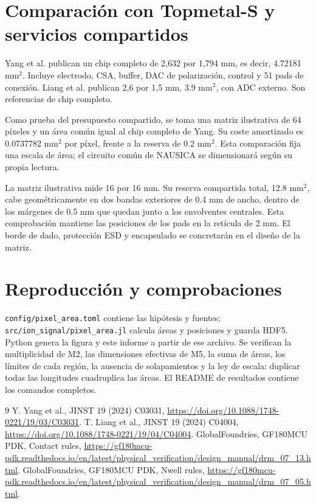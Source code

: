 \documentclass[11pt,a4paper]{article}
\begin{document}
\section*{Comparación con Topmetal-S y servicios compartidos}
Yang et al. publican un chip completo de 2,632 por 1,794 mm, es decir,
4.72181 mm$^2$. Incluye electrodo, CSA, buffer, DAC de polarización, control y
51 pads de conexión. Liang et al. publican 2,6 por 1,5 mm, 3.9 mm$^2$,
con ADC externo. Son referencias de chip completo.

Como prueba del presupuesto compartido, se toma una matriz ilustrativa de
64 píxeles y un área común igual al chip completo de Yang. Su coste
amortizado es 0.0737782 mm$^2$ por píxel, frente a la reserva de 0.2
mm$^2$. Esta comparación fija una escala de área; el circuito común de NAUSICA
se dimensionará según su propia lectura.

La matriz ilustrativa mide 16 por 16 mm. Su reserva compartida total,
12.8 mm$^2$, cabe geométricamente en dos bandas exteriores de 0.4
mm de ancho, dentro de los márgenes de 0.5 mm que quedan junto a los
envolventes centrales. Esta comprobación mantiene las posiciones de los pads
en la retícula de 2 mm. El borde de dado, protección ESD y encapsulado se
concretarán en el diseño de la matriz.

\section*{Reproducción y comprobaciones}
\texttt{config/pixel\_area.toml} contiene las hipótesis y fuentes;
\texttt{src/ion\_signal/pixel\_area.jl} calcula áreas y posiciones y guarda
HDF5. Python genera la figura y este informe a partir de ese archivo.
Se verifican la multiplicidad de M2, las dimensiones efectivas de M5, la suma
de áreas, los límites de cada región, la ausencia de solapamientos y la ley
de escala: duplicar todas las longitudes cuadruplica las áreas.
El README de resultados contiene los comandos completos.

\begin{thebibliography}{9}
 Y. Yang et al., JINST 19 (2024) C03031,
\url{https://doi.org/10.1088/1748-0221/19/03/C03031}.
 T. Liang et al., JINST 19 (2024) C04004,
\url{https://doi.org/10.1088/1748-0221/19/04/C04004}.
 GlobalFoundries, GF180MCU PDK, Contact rules,
\url{https://gf180mcu-pdk.readthedocs.io/en/latest/physical_verification/design_manual/drm_07_13.html}.
 GlobalFoundries, GF180MCU PDK, Nwell rules,
\url{https://gf180mcu-pdk.readthedocs.io/en/latest/physical_verification/design_manual/drm_07_05.html}.
\end{thebibliography}
\end{document}
